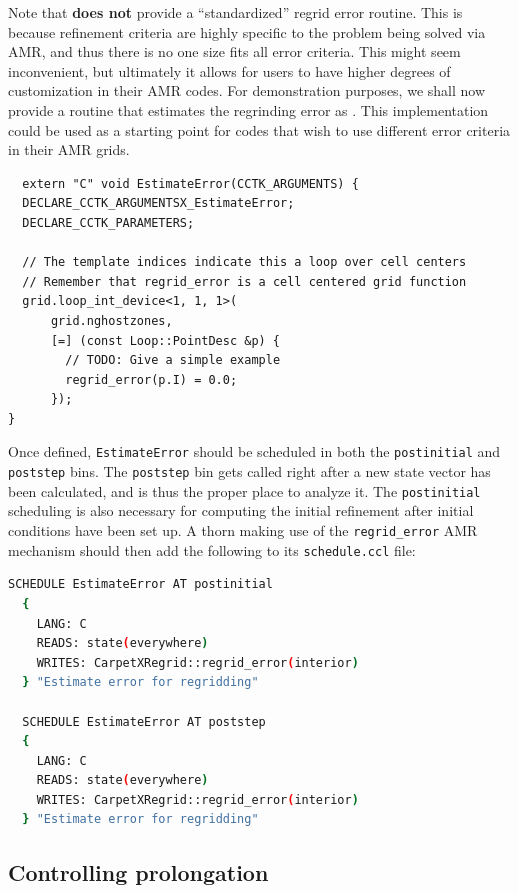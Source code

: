 Note that \CarpetX\space \textbf{does not} provide a ``standardized'' regrid error routine. This is because refinement criteria are highly specific to the problem being solved via AMR, and thus there is no one size fits all error criteria. This might seem inconvenient, but ultimately it allows for users to have higher degrees of customization in their AMR codes. For demonstration purposes, we shall now provide a routine that estimates the regrinding error as . This implementation could be used as a starting point for codes that wish to use different error criteria in their AMR grids.

\begin{lstlisting}
  extern "C" void EstimateError(CCTK_ARGUMENTS) {
  DECLARE_CCTK_ARGUMENTSX_EstimateError;
  DECLARE_CCTK_PARAMETERS;

  // The template indices indicate this a loop over cell centers
  // Remember that regrid_error is a cell centered grid function
  grid.loop_int_device<1, 1, 1>(
      grid.nghostzones,
      [=] (const Loop::PointDesc &p) {
        // TODO: Give a simple example
        regrid_error(p.I) = 0.0;
      });
}
\end{lstlisting}

Once defined, \texttt{EstimateError} should be scheduled in both the \texttt{postinitial} and \texttt{poststep} bins. The \texttt{poststep} bin gets called right after a new state vector has been calculated, and is thus the proper place to analyze it. The \texttt{postinitial} scheduling is also necessary for computing the initial refinement after initial conditions have been set up. A thorn making use of the \texttt{regrid\_error} AMR mechanism should then add the following to its \texttt{schedule.ccl} file:

\begin{lstlisting}[language=bash]
  SCHEDULE EstimateError AT postinitial
  {
    LANG: C
    READS: state(everywhere)
    WRITES: CarpetXRegrid::regrid_error(interior)
  } "Estimate error for regridding"
  
  SCHEDULE EstimateError AT poststep
  {
    LANG: C
    READS: state(everywhere)
    WRITES: CarpetXRegrid::regrid_error(interior)
  } "Estimate error for regridding"
\end{lstlisting}

\subsection{Controlling prolongation}

